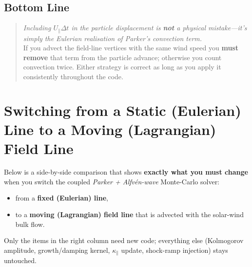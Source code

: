 \subsection*{Bottom Line}

\begin{quote}
\emph{Including $U_{\parallel}\Delta t$ in the particle displacement is \textbf{not} a physical mistake—it’s simply the Eulerian realisation of Parker’s convection term.}\\
If you advect the field-line vertices with the same wind speed you \textbf{must remove} that term from the particle advance; otherwise you count convection twice. Either strategy is correct as long as you apply it consistently throughout the code.
\end{quote}


\section*{Switching from a Static (Eulerian) Line to a Moving (Lagrangian) Field Line}

Below is a side-by-side comparison that shows \textbf{exactly what you must change} when you switch the coupled \emph{Parker + Alfvén-wave} Monte-Carlo solver:
\begin{itemize}
\item from a \textbf{fixed (Eulerian) line},
\item to a \textbf{moving (Lagrangian) field line} that is advected with the solar-wind bulk flow.
\end{itemize}

Only the items in the right column need new code; everything else (Kolmogorov amplitude, growth/damping kernel, $\kappa_\parallel$ update, shock-ramp injection) stays untouched.

